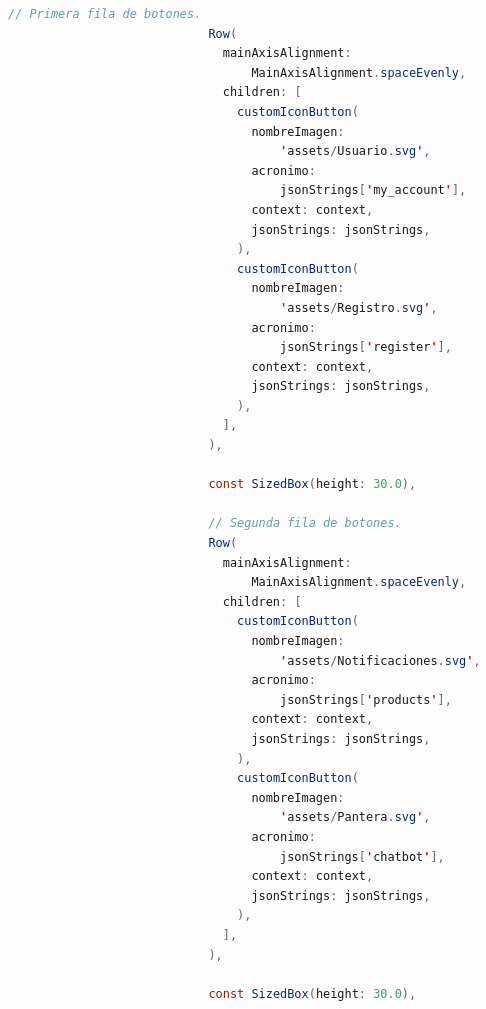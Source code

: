\begin{lstlisting}[language=Java, caption={Screen welcome page completo}]
                            // Primera fila de botones.
                            Row(
                              mainAxisAlignment:
                                  MainAxisAlignment.spaceEvenly,
                              children: [
                                customIconButton(
                                  nombreImagen:
                                      'assets/Usuario.svg',
                                  acronimo:
                                      jsonStrings['my_account'],
                                  context: context,
                                  jsonStrings: jsonStrings,
                                ),
                                customIconButton(
                                  nombreImagen:
                                      'assets/Registro.svg',
                                  acronimo:
                                      jsonStrings['register'],
                                  context: context,
                                  jsonStrings: jsonStrings,
                                ),
                              ],
                            ),

                            const SizedBox(height: 30.0),

                            // Segunda fila de botones.
                            Row(
                              mainAxisAlignment:
                                  MainAxisAlignment.spaceEvenly,
                              children: [
                                customIconButton(
                                  nombreImagen:
                                      'assets/Notificaciones.svg',
                                  acronimo:
                                      jsonStrings['products'],
                                  context: context,
                                  jsonStrings: jsonStrings,
                                ),
                                customIconButton(
                                  nombreImagen:
                                      'assets/Pantera.svg',
                                  acronimo:
                                      jsonStrings['chatbot'],
                                  context: context,
                                  jsonStrings: jsonStrings,
                                ),
                              ],
                            ),

                            const SizedBox(height: 30.0),


\end{lstlisting}

